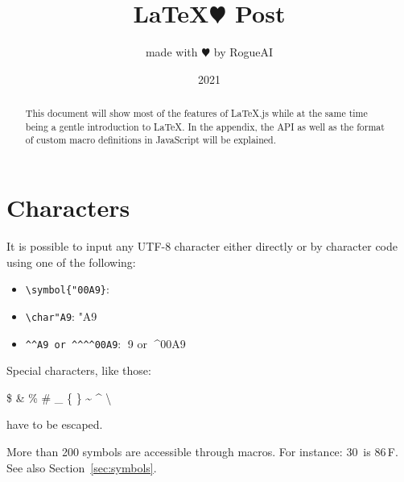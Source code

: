 \documentclass{article}
\title{\LaTeX $\varheartsuit$ Post}
\author{made with $\varheartsuit$ by RogueAI}
\date{2021}
\begin{document}
    \maketitle
    \begin{abstract}
        This document will show most of the features of \LaTeX.js while at the same time being a gentle introduction to \LaTeX.
        In the appendix, the API as well as the format of custom macro definitions in JavaScript will be explained.
    \end{abstract}
    
    \section{Characters}

    It is possible to input any UTF-8 character either directly or by character code
    using one of the following:

    \begin{itemize}
        \item \texttt{\textbackslash symbol\{"00A9\}}: 
        \item \verb|\char"A9|: \char"A9
        \item \verb|^^A9 or ^^^^00A9|: ^^A9 or ^^^^00A9
    \end{itemize}

    \bigskip

    \noindent
    Special characters, like those:
    \begin{center}
        \$ \& \% \# \_ \{ \} \~{} \^{} \textbackslash %
    \end{center}
%
    have to be escaped.

    More than 200 symbols are accessible through macros. For instance: 30\,\textcelsius{} is
    86\,\textdegree{}F. See also Section~\ref{sec:symbols}.
\end{document}
